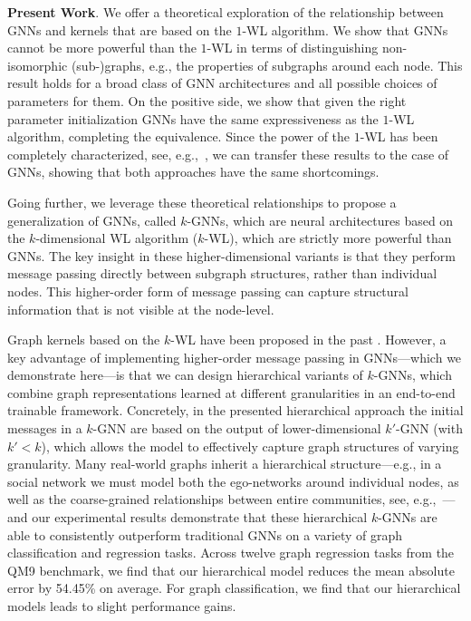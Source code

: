 \documentclass[letterpaper]{article}
\theoremstyle{definition}
\newcommand{\xhdr}[1]{{\noindent\bfseries #1}.}
\begin{document}
\xhdr{Present Work}
We offer a theoretical exploration of the relationship between GNNs and kernels that are based on the $1$-WL algorithm. 
We show that GNNs cannot be more powerful than the $1$-WL in terms of distinguishing non-isomorphic (sub-)graphs, e.g., the properties of subgraphs around each node. 
This result holds for a broad class of GNN architectures and all possible choices of parameters for them.
On the positive side, we show that given the right parameter initialization GNNs have the same expressiveness as the $1$-WL algorithm, completing the equivalence. 
Since the power of the $1$-WL has been completely characterized, see, e.g.,~\cite{Arv+2015,kiefer2015graphs}, we can transfer these results to the case of GNNs, showing that both approaches have the same shortcomings.

Going further, we leverage these theoretical relationships to propose a generalization of GNNs, called $k$-GNNs, which are neural architectures based on the $k$-dimensional WL algorithm ($k$-WL), which are strictly more powerful than GNNs. 
The key insight in these higher-dimensional variants is that they perform message passing directly between subgraph structures, rather than individual nodes.
This higher-order form of message passing can capture structural information that is not visible at the node-level.

Graph kernels based on the $k$-WL have been proposed in the past \cite{Mor+2017}.
However, a key advantage of implementing higher-order message passing in GNNs---which we demonstrate here---is that we can design hierarchical variants of $k$-GNNs, which combine graph representations learned at different granularities in an end-to-end trainable framework. 
Concretely, in the presented hierarchical approach the initial messages in a $k$-GNN are based on the output of lower-dimensional $k'$-GNN (with $k' < k$), which allows the model to effectively capture graph structures of varying granularity.  Many real-world graphs inherit a hierarchical structure---e.g., in a social network we must model both the ego-networks around individual nodes, as well as the coarse-grained relationships between entire communities, see, e.g.,~\cite{New2003}---and our experimental results demonstrate that these hierarchical $k$-GNNs are able to consistently outperform traditional GNNs on a variety of graph classification and regression tasks. Across twelve graph regression tasks from the QM9 benchmark, we find that our hierarchical model reduces the mean absolute error by 54.45\% on average. For graph classification, we find that our hierarchical models leads to slight performance gains.
\end{document}
